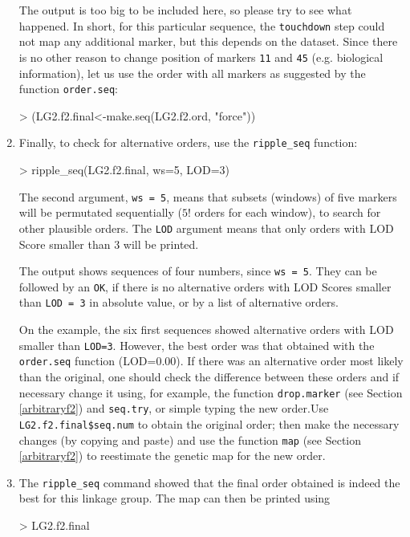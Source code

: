\documentclass[letterpaper,12pt,oneside]{article}
\begin{document}
\begin{enumerate}
The output is too big to be included here, so please try to see what happened. In short, for this particular sequence, the {\tt touchdown} step could not map any additional marker, but this depends on the dataset. Since there is no other reason to change position of markers {\tt 11} and {\tt 45} (e.g. biological information), let us use the order with all markers as suggested by the function {\tt order.seq}:

\begin{Schunk}
\begin{Sinput}
> (LG2.f2.final<-make.seq(LG2.f2.ord, "force"))
\end{Sinput}
\end{Schunk}

\item Finally, to check for alternative orders, use the {\tt ripple_seq} function:
\begin{Schunk}
\begin{Sinput}
> ripple_seq(LG2.f2.final, ws=5, LOD=3)
\end{Sinput}
\end{Schunk}
The second argument, {\tt ws = 5}, means that subsets (windows) of five markers will be permutated sequentially ({\tt $5!$} orders for each window), to search for other plausible orders. The {\tt LOD} argument means that only orders with LOD Score smaller than 3 will be printed.

The output shows sequences of four numbers, since {\tt ws = 5}.  They can be followed by an {\tt OK}, if there is no alternative orders with LOD Scores smaller than {\tt LOD = 3} in absolute value, or by a list of alternative orders.

On the example, the six first sequences showed alternative orders with LOD smaller than {\tt LOD=3}. However, the best order was that obtained with the {\tt order.seq} function (LOD=0.00). If there was an alternative order most likely than the original, one should check the difference between these orders and if necessary change it using, for example, the function {\tt drop.marker} (see Section \ref{arbitraryf2}) and {\tt seq.try}, or simple typing the new order.Use {\tt LG2.f2.final\$seq.num} to obtain the original order; then make the necessary changes (by copying and paste) and use the function {\tt map} (see Section \ref{arbitraryf2}) to reestimate the genetic map for the new order.

\item The {\tt ripple_seq} command showed that the final order obtained is indeed the best for this linkage group. The map can then be printed using
    
\begin{Schunk}
\begin{Sinput}
> LG2.f2.final
\end{Sinput}
\end{Schunk}

\end{enumerate}
\end{document}
